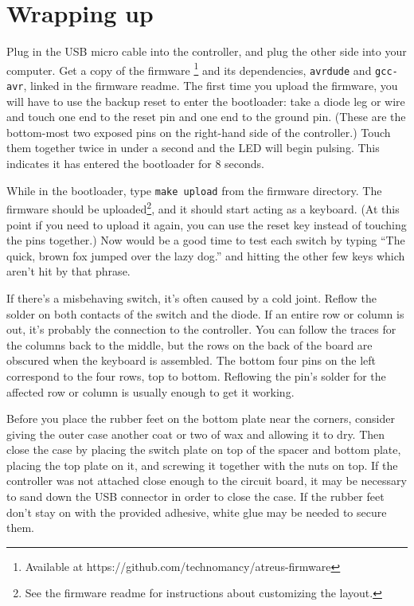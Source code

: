 \documentclass{article}
\begin{document}
\section{Wrapping up}

Plug in the USB micro cable into the controller, and plug the other
side into your computer. Get a copy of the
firmware \footnote{Available at
  https://github.com/technomancy/atreus-firmware} and its
dependencies, \texttt{avrdude} and \texttt{gcc-avr}, linked in the
firmware readme. The first time you upload the firmware, you will have
to use the backup reset to enter the bootloader: take a diode leg or
wire and touch one end to the reset pin and one end to the ground
pin. (These are the bottom-most two exposed pins on the right-hand
side of the controller.) Touch them together twice in under a second
and the LED will begin pulsing. This indicates it has entered the
bootloader for 8 seconds.

\vspace{1em}

While in the bootloader, type \texttt{make upload} from the firmware
directory. The firmware should be uploaded\footnote{See the firmware
  readme for instructions about customizing the layout.}, and it
should start acting as a keyboard. (At this point if you need to
upload it again, you can use the reset key instead of touching the
pins together.) Now would be a good time to test each switch by typing
``The quick, brown fox jumped over the lazy dog.'' and hitting the
other few keys which aren't hit by that phrase.

\vspace{1em}

If there's a misbehaving switch, it's often caused by a cold
joint. Reflow the solder on both contacts of the switch and the
diode. If an entire row or column is out, it's probably the connection
to the controller. You can follow the traces for the columns back
to the middle, but the rows on the back of the board are obscured when
the keyboard is assembled. The bottom four pins on the left correspond
to the four rows, top to bottom. Reflowing the pin's solder for the
affected row or column is usually enough to get it working.

\vspace{1em}

Before you place the rubber feet on the bottom plate near the corners,
consider giving the outer case another coat or two of wax and allowing
it to dry. Then close the case by placing the switch plate on top of
the spacer and bottom plate, placing the top plate on it, and screwing
it together with the nuts on top. If the controller was not attached
close enough to the circuit board, it may be necessary to sand down
the USB connector in order to close the case. If the rubber feet don't
stay on with the provided adhesive, white glue may be needed to secure
them.
\end{document}
